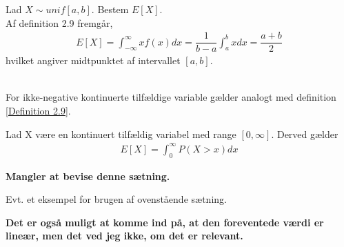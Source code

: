\begin{eks} Lad $X \sim unif[a,b]$. Bestem $E[X]$.\\
Af definition 2.9 fremgår,\\
\begin{align*}
    E[X]=\int_{-\infty}^\infty xf(x)dx = \dfrac{1}{b-a}\int_{a}^b xdx = \dfrac{a+b}{2}
\end{align*}
hvilket angiver midtpunktet af intervallet $[a,b]$.
\end{eks}
\\
For ikke-negative kontinuerte tilfældige variable gælder analogt med definition \ref{Definition 2.9}.
\begin{thmx}
Lad X være en kontinuert tilfældig variabel med range $[0,\infty].$ Derved gælder
\begin{align*}
    E[X]=\int_{0}^\infty P(X > x) dx
\end{align*}
\end{thmx}
\begin{bev}
\textbf{Mangler at bevise denne sætning.}
\end{bev}

\begin{eks}
Evt. et eksempel for brugen af ovenstående sætning.
\end{eks}

\textbf{Det er også muligt at komme ind på, at den foreventede værdi er lineær, men det ved jeg ikke, om det er relevant.}
\fi

